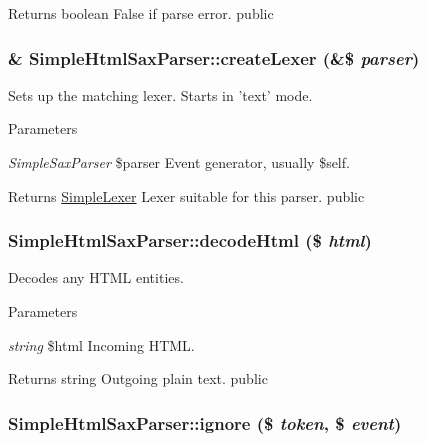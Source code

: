 \begin{DoxyReturn}{Returns}
boolean False if parse error.  public 
\end{DoxyReturn}
\hypertarget{class_simple_html_sax_parser_a0c7fea7ce76c8d91d167f0b7c6f6b91d}{
\subsubsection[{createLexer}]{\setlength{\rightskip}{0pt plus 5cm}\& SimpleHtmlSaxParser::createLexer (\&\$ {\em parser})}}
\label{class_simple_html_sax_parser_a0c7fea7ce76c8d91d167f0b7c6f6b91d}
Sets up the matching lexer. Starts in 'text' mode. 
\begin{DoxyParams}{Parameters}
\item[{\em SimpleSaxParser}]\$parser Event generator, usually \$self. \end{DoxyParams}
\begin{DoxyReturn}{Returns}
\hyperlink{class_simple_lexer}{SimpleLexer} Lexer suitable for this parser.  public 
\end{DoxyReturn}
\hypertarget{class_simple_html_sax_parser_afbd8c1c10a2b76270fabf7358340b58d}{
\subsubsection[{decodeHtml}]{\setlength{\rightskip}{0pt plus 5cm}SimpleHtmlSaxParser::decodeHtml (\$ {\em html})}}
\label{class_simple_html_sax_parser_afbd8c1c10a2b76270fabf7358340b58d}
Decodes any HTML entities. 
\begin{DoxyParams}{Parameters}
\item[{\em string}]\$html Incoming HTML. \end{DoxyParams}
\begin{DoxyReturn}{Returns}
string Outgoing plain text.  public 
\end{DoxyReturn}
\hypertarget{class_simple_html_sax_parser_a2f1f52f6ef26043cb8bef7ab0e62dc7c}{
\subsubsection[{ignore}]{\setlength{\rightskip}{0pt plus 5cm}SimpleHtmlSaxParser::ignore (\$ {\em token}, \/  \$ {\em event})}}
